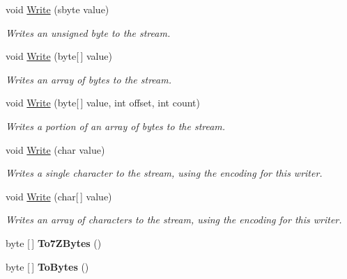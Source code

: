 \begin{DoxyCompactItemize}
void \mbox{\hyperlink{class_t_net_1_1_i_o_1_1_endian_binary_writer_a7049eb981b6df90c439d2d628f214d00}{Write}} (sbyte value)
\begin{DoxyCompactList}\small\item\em Writes an unsigned byte to the stream. \end{DoxyCompactList}\item 
void \mbox{\hyperlink{class_t_net_1_1_i_o_1_1_endian_binary_writer_a1553ebc4c48f14bf512eba2c225fe837}{Write}} (byte\mbox{[}$\,$\mbox{]} value)
\begin{DoxyCompactList}\small\item\em Writes an array of bytes to the stream. \end{DoxyCompactList}\item 
void \mbox{\hyperlink{class_t_net_1_1_i_o_1_1_endian_binary_writer_af2f985c31a87205aef4ca584ff025f2f}{Write}} (byte\mbox{[}$\,$\mbox{]} value, int offset, int count)
\begin{DoxyCompactList}\small\item\em Writes a portion of an array of bytes to the stream. \end{DoxyCompactList}\item 
void \mbox{\hyperlink{class_t_net_1_1_i_o_1_1_endian_binary_writer_a0fddd902dbf14a6b7a1d48682667fecb}{Write}} (char value)
\begin{DoxyCompactList}\small\item\em Writes a single character to the stream, using the encoding for this writer. \end{DoxyCompactList}\item 
void \mbox{\hyperlink{class_t_net_1_1_i_o_1_1_endian_binary_writer_add56922a40bf9ad7755738d80bd57cd2}{Write}} (char\mbox{[}$\,$\mbox{]} value)
\begin{DoxyCompactList}\small\item\em Writes an array of characters to the stream, using the encoding for this writer. \end{DoxyCompactList}\item 
\mbox{\label{class_t_net_1_1_i_o_1_1_endian_binary_writer_ad372269995f4662f6288848ab2e6d2d9}} 
byte \mbox{[}$\,$\mbox{]} {\bfseries To7\+Z\+Bytes} ()
\item 
\mbox{\label{class_t_net_1_1_i_o_1_1_endian_binary_writer_adef01f367590629ad047981e27eea4f2}} 
byte \mbox{[}$\,$\mbox{]} {\bfseries To\+Bytes} ()

\end{DoxyCompactItemize}
